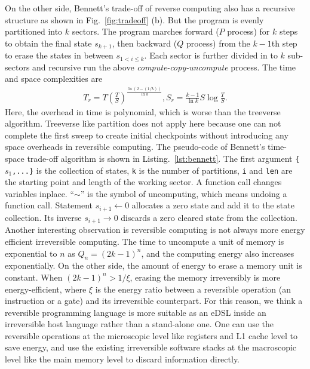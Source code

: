 \documentclass{article}
\newcommand{\<}{\langle}
\renewcommand{\>}{\rangle}
\newcommand{\Fig}[1]{Fig.~\ref{#1}}
\newcommand{\Lst}[1]{Listing.~\ref{#1}}
\theoremstyle{definition}\newtheorem{definition}{\textit{Definition}}
\begin{document}
On the other side, Bennett's trade-off of reverse computing also has a recursive structure as shown in \Fig{fig:tradeoff} (b). But the program is evenly partitioned into $k$ sectors. The program marches forward ($P$ process) for $k$ steps to obtain the final state $s_{k+1}$, then backward ($Q$ process) from the $k-1$th step to erase the states in between $s_{1<i\leq k}$. Each sector is further divided in to $k$ sub-sectors and recursive run the above \textit{compute-copy-uncompute} process. The time and space complexities are
\begin{align}\label{eq:rev}
    T_r = T\left(\frac{T}{S}\right)^{\frac{\ln(2-(1/k))}{\ln k}}, S_r = \frac{k-1}{\ln k}S\log\frac{T}{S}.
\end{align}
Here, the overhead in time is polynomial, which is worse than the treeverse algorithm. Treeverse like partition does not apply here because one can not complete the first sweep to create initial checkpoints without introducing any space overheads in reversible computing. The pseudo-code of Bennett's time-space trade-off algorithm is shown in \Lst{lst:bennett}.
The first argument \texttt{\{$s_1$,...\}} is the collection of states, \texttt{k} is the number of partitions, \texttt{i} and \texttt{len} are the starting point and length of the working sector. A function call changes variables inplace. ``$\sim$'' is the symbol of uncomputing, which means undoing a function call.
    Statement \texttt{$s_{i+1} \leftarrow 0$} allocates a zero state and add it to the state collection. Its inverse \texttt{$s_{i+1} \rightarrow 0$} discards a zero cleared state from the collection.
    Another interesting observation is reversible computing is not always more energy efficient irreversible computing. The time to uncompute a unit of memory is exponential to $n$ as $Q_n = (2k-1)^n$, and the computing energy also increases exponentially. On the other side, the amount of energy to erase a memory unit is constant.
    When $(2k-1)^{n} > 1/\xi$, erasing the memory irreversibly is more energy-efficient, where $\xi$ is the energy ratio between a reversible operation (an instruction or a gate) and its irreversible counterpart.
For this reason, we think a reversible programming language is more suitable as an eDSL inside an irreversible host language rather than a stand-alone one.
One can use the reversible operations at the microscopic level like registers and L1 cache level to save energy, and use the existing irreversible software stacks at the macroscopic level like the main memory level to discard information directly.
\end{document}
